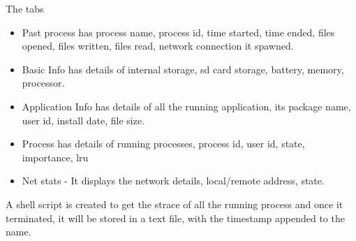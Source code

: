\documentclass[12pt]{report}
\begin{document}
The tabs
\begin{itemize}
	\item Past process has process name, process id, time started, time ended, files opened, files written, files read, network connection it spawned.
	\item Basic Info has details of internal storage, sd card storage, battery, memory, processor.
	\item Application Info has details of all the running application, its package name, user id, install date, file size.
	\item Process has details of running processes, process id, user id, state, importance, lru
	\item Net stats - It displays the network details, local/remote address, state.
\end{itemize} 

A shell script is created to get the strace of all the running process and once it terminated, it will be stored in a text file, with the timestamp appended to the name.
\end{document}

